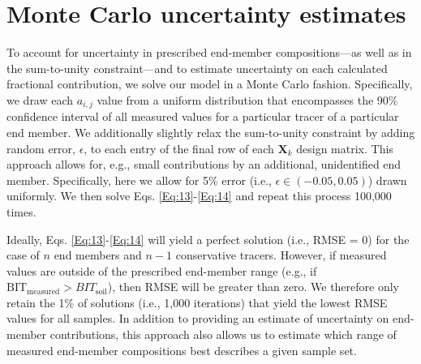 \documentclass{amsart}
\begin{document}
\section{Monte Carlo uncertainty estimates}\label{Sec:3}
%
To account for uncertainty in prescribed end-member compositions---as well as in the sum-to-unity constraint---and to estimate uncertainty on each calculated fractional contribution, we solve our model in a Monte Carlo fashion. Specifically, we draw each $a_{i,j}$ value from a uniform distribution that encompasses the 90\% confidence interval of all measured values for a particular tracer of a particular end member. We additionally slightly relax the sum-to-unity constraint by adding random error, $\epsilon$, to each entry of the final row of each $\bm{X}_k$ design matrix. This approach allows for, e.g., small contributions by an additional, unidentified end member. Specifically, here we allow for 5\% error (i.e., $\epsilon \in \left( -0.05, 0.05 \right)$) drawn uniformly. We then solve Eqs. \ref{Eq:13}-\ref{Eq:14} and repeat this process 100,000 times.

Ideally, Eqs. \ref{Eq:13}-\ref{Eq:14} will yield a perfect solution (i.e., RMSE = 0) for the case of $n$ end members and $n-1$ conservative tracers. However, if measured values are outside of the prescribed end-member range (e.g., if $\text{BIT}_\text{measured} > \textit{BIT}_\text{soil}$), then RMSE will be greater than zero. We therefore only retain the 1\% of solutions (i.e., 1,000 iterations) that yield the lowest RMSE values for all samples. In addition to providing an estimate of uncertainty on end-member contributions, this approach also allows us to estimate which range of measured end-member compositions best describes a given sample set.
\end{document}
